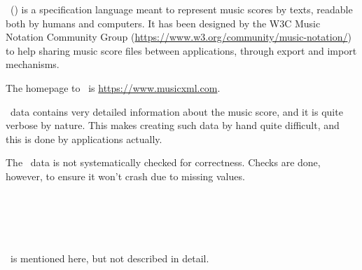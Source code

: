 \mxml\ () is a specification language meant to represent music scores by texts, readable both by humans and computers. It has been designed by the W3C Music Notation Community Group (\url{https://www.w3.org/community/music-notation/}) to help sharing music score files between applications, through export and import mechanisms.

The homepage to \mxml\ is \url{https://www.musicxml.com}.

\mxml\ data contains very detailed information about the music score, and it is quite verbose by nature. This makes creating such data by hand quite difficult, and this is done by applications actually.

The \mxml\ data is not systematically checked for correctness. Checks are done, however, to ensure it won't crash due to missing values.


\section{\xmlToBrl\ }

\xmlToBrl\ is mentioned here, but not described in detail.


\section{\xmlToXml\ }


\section{\xmlToGmn\ }


\section{\msdlconverter}%


